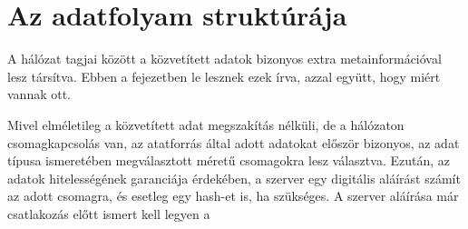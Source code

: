 \chapter{Az adatfolyam struktúrája}

A hálózat tagjai között a közvetített adatok bizonyos extra
metainformációval lesz társítva. Ebben a fejezetben le lesznek ezek írva,
azzal együtt, hogy miért vannak ott.

Mivel elméletileg a közvetített adat megszakítás nélküli, de a hálózaton
csomagkapcsolás van, az atatforrás által adott adatokat először bizonyos,
az adat típusa ismeretében megválasztott méretű csomagokra lesz választva.
Ezután, az adatok hitelességének garanciája érdekében, a szerver egy
digitális aláírást számít az adott csomagra, és esetleg egy hash-et is,
ha szükséges. A szerver aláírása már csatlakozás előtt ismert kell legyen
a 
